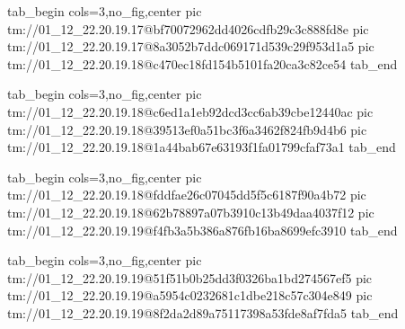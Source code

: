 \ifcmt
  tab_begin cols=3,no_fig,center
    pic tm://01_12_22.20.19.17@bf70072962dd4026cdfb29c3c888fd8e
    pic tm://01_12_22.20.19.17@8a3052b7ddc069171d539c29f953d1a5
    pic tm://01_12_22.20.19.18@c470ec18fd154b5101fa20ca3c82ce54
  tab_end
\fi


\ifcmt
  tab_begin cols=3,no_fig,center
    pic tm://01_12_22.20.19.18@c6ed1a1eb92dcd3cc6ab39cbe12440ac
    pic tm://01_12_22.20.19.18@39513ef0a51bc3f6a3462f824fb9d4b6
    pic tm://01_12_22.20.19.18@1a44bab67e63193f1fa01799cfaf73a1
  tab_end
\fi


\ifcmt
  tab_begin cols=3,no_fig,center
    pic tm://01_12_22.20.19.18@fddfae26c07045dd5f5c6187f90a4b72
    pic tm://01_12_22.20.19.18@62b78897a07b3910c13b49daa4037f12
    pic tm://01_12_22.20.19.19@f4fb3a5b386a876fb16ba8699efc3910
  tab_end
\fi


\ifcmt
  tab_begin cols=3,no_fig,center
    pic tm://01_12_22.20.19.19@51f51b0b25dd3f0326ba1bd274567ef5
    pic tm://01_12_22.20.19.19@a5954c0232681c1dbe218c57c304e849
    pic tm://01_12_22.20.19.19@8f2da2d89a75117398a53fde8af7fda5
  tab_end
\fi

